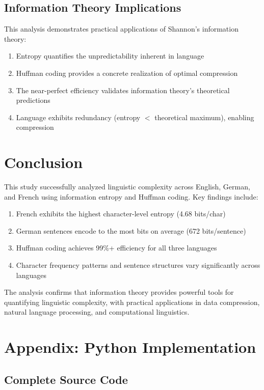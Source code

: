 \documentclass[11pt]{article}
\begin{document}
\subsection{Information Theory Implications}
This analysis demonstrates practical applications of Shannon's information theory:
\begin{enumerate}
    \item Entropy quantifies the unpredictability inherent in language
    \item Huffman coding provides a concrete realization of optimal compression
    \item The near-perfect efficiency validates information theory's theoretical predictions
    \item Language exhibits redundancy (entropy $<$ theoretical maximum), enabling compression
\end{enumerate}

\section{Conclusion}
This study successfully analyzed linguistic complexity across English, German, and French using information entropy and Huffman coding. Key findings include:
\begin{enumerate}
    \item French exhibits the highest character-level entropy (4.68 bits/char)
    \item German sentences encode to the most bits on average (672 bits/sentence)
    \item Huffman coding achieves 99\%+ efficiency for all three languages
    \item Character frequency patterns and sentence structures vary significantly across languages
\end{enumerate}

The analysis confirms that information theory provides powerful tools for quantifying linguistic complexity, with practical applications in data compression, natural language processing, and computational linguistics.

\section{Appendix: Python Implementation}

\subsection{Complete Source Code}
\end{document}
